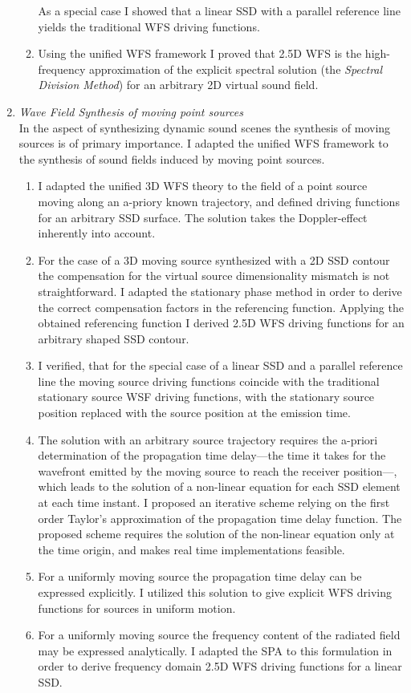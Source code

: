 \documentclass[a4paper,10pt]{article}
\begin{document}
\begin{enumerate}
\begin{enumerate}
As a special case I showed that a linear SSD with a parallel reference line yields the traditional WFS driving functions.
\item Using the unified WFS framework I proved that 2.5D WFS is the high-frequency approximation of the explicit spectral solution (the \emph{Spectral Division Method}) for an arbitrary 2D virtual sound field.
\end{enumerate}
%
\item \emph{Wave Field Synthesis of moving point sources}\\
In the aspect of synthesizing dynamic sound scenes the synthesis of moving sources is of primary importance.
I adapted the unified WFS framework to the synthesis of sound fields induced by moving point sources.
\begin{enumerate}
\item I adapted the unified 3D WFS theory to the field of a point source moving along an a-priory known trajectory, and defined driving functions for an arbitrary SSD surface.
The solution takes the Doppler-effect inherently into account.
\item For the case of a 3D moving source synthesized with a 2D SSD contour the compensation for the virtual source dimensionality mismatch is not straightforward.
I adapted the stationary phase method in order to derive the correct compensation factors in the referencing function. 
Applying the obtained referencing function I derived 2.5D WFS driving functions for an arbitrary shaped SSD contour.
\item I verified, that for the special case of a linear SSD and a parallel reference line the moving source driving functions coincide with the traditional stationary source WSF driving functions, with the stationary source position replaced with the source position at the emission time.
\item The solution with an arbitrary source trajectory requires the a-priori determination of the propagation time delay---the time it takes for the wavefront emitted by the moving source to reach the receiver position---, which leads to the solution of a non-linear equation for each SSD element at each time instant.
I proposed an iterative scheme relying on the first order Taylor's approximation of the propagation time delay function.
The proposed scheme requires the solution of the non-linear equation only at the time origin, and makes real time implementations feasible.
\item For a uniformly moving source the propagation time delay can be expressed explicitly.
I utilized this solution to give explicit WFS driving functions for sources in uniform motion.
\item For a uniformly moving source the frequency content of the radiated field may be expressed analytically.
I adapted the SPA to this formulation in order to derive frequency domain 2.5D WFS driving functions for a linear SSD.
\end{enumerate}


\end{enumerate}
\end{document}
